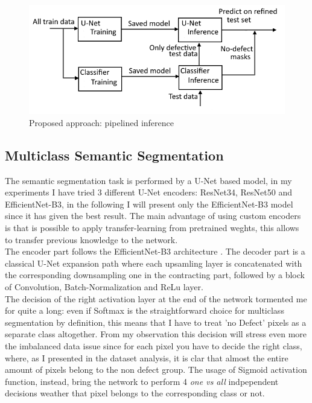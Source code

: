 \documentclass[10pt,twocolumn,letterpaper]{article}
\begin{document}
   \begin{figure}[h]
      \caption{Proposed approach: pipelined inference } \label{fig:secondApproach}
      \includegraphics[scale=0.48]{Img_SecondApproach}
   \end{figure}


   \subsection{Multiclass Semantic Segmentation}
   The semantic segmentation task is performed by a U-Net based model, in my experiments I have tried 3 different U-Net encoders: ResNet34, ResNet50 and EfficientNet-B3, in the following I will present only the EfficientNet-B3 model since it has given the best result.
   The main advantage of using custom encoders is that is possible to apply transfer-learning from pretrained weghts, this allows to transfer previous knowledge to the network. \\
   The encoder part follows the EfficientNet-B3 architecture \cite{efficientnet}. The decoder part is a classical U-Net expansion path where each upsamling layer is concatenated with the corresponding downsampling one in the contracting part, followed by a block of Convolution, Batch-Normalization and ReLu layer. \\
   The decision of the right activation layer at the end of the network tormented me for quite a long: even if Softmax is the straightforward choice for multiclass segmentation by definition, this means that I have to treat 'no Defect' pixels as a separate class altogether. From my observation this decision will stress even more the imbalanced data issue since for each pixel you have to decide the right class, where, as I presented in the dataset analysis, it is clar that almost the entire amount of pixels belong to the non defect group. The usage of Sigmoid activation function, instead, bring the network to perform 4 \textit{one vs all} indpependent decisions weather that pixel belongs to the corresponding class or not. 
\end{document}

